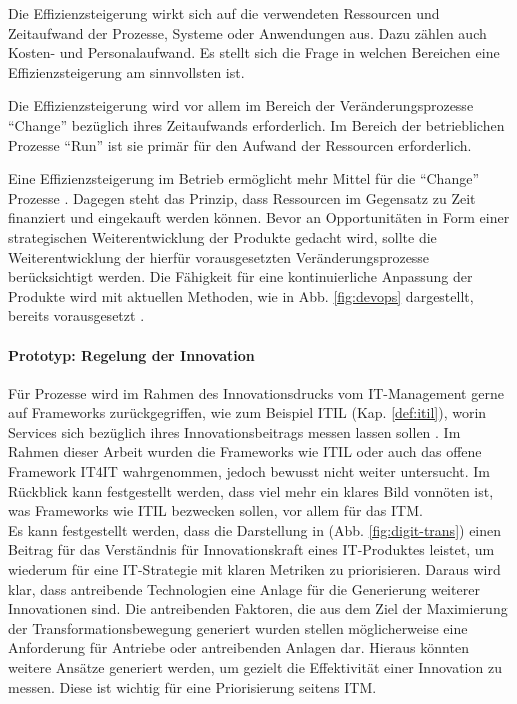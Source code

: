 \begin{enumerate}
    Die Effizienzsteigerung wirkt sich auf die verwendeten Ressourcen und Zeitaufwand der Prozesse, Systeme oder Anwendungen aus. Dazu zählen auch Kosten- und Personalaufwand. Es stellt sich die Frage in welchen Bereichen eine Effizienzsteigerung am sinnvollsten ist.
    
    Die Effizienzsteigerung wird vor allem im Bereich der Veränderungsprozesse \enquote{Change} bezüglich ihres Zeitaufwands erforderlich. Im Bereich der betrieblichen Prozesse \enquote{Run} ist sie primär für den Aufwand der Ressourcen erforderlich.
    
    Eine Effizienzsteigerung im Betrieb ermöglicht mehr Mittel für die \enquote{Change} Prozesse \cite{Rausch2006}. Dagegen steht das Prinzip, dass Ressourcen im Gegensatz zu Zeit finanziert und eingekauft werden können. Bevor an Opportunitäten in Form einer strategischen Weiterentwicklung der Produkte \cite{Rausch2006} gedacht wird, sollte die Weiterentwicklung der hierfür vorausgesetzten Veränderungsprozesse berücksichtigt werden. Die Fähigkeit für eine kontinuierliche Anpassung \cite{Bussmann2006, Ganswindt2006} der Produkte wird mit aktuellen Methoden, wie in Abb. \ref{fig:devops} dargestellt, bereits vorausgesetzt \cite{Alt2017}.

\end{enumerate}

\paragraph{Prototyp: Regelung der Innovation}
Für Prozesse wird im Rahmen des Innovationsdrucks vom IT-Management gerne auf Frameworks zurückgegriffen, wie zum Beispiel ITIL (Kap. \ref{def:itil}), worin Services sich bezüglich ihres Innovationsbeitrags messen lassen sollen \cite{Alt2017}. Im Rahmen dieser Arbeit wurden die Frameworks wie ITIL oder auch das offene Framework IT4IT wahrgenommen, jedoch bewusst nicht weiter untersucht. Im Rückblick kann festgestellt werden, dass viel mehr ein klares Bild vonnöten ist, was Frameworks wie ITIL bezwecken sollen, vor allem für das \ac{ITM}.
\medskip
\\
Es kann festgestellt werden, dass die Darstellung in (Abb. \ref{fig:digit-trans}) einen Beitrag für das Verständnis für Innovationskraft eines IT-Produktes leistet, um wiederum für eine IT-Strategie mit klaren Metriken zu priorisieren. Daraus wird klar, dass antreibende Technologien eine Anlage für die Generierung weiterer Innovationen sind. Die antreibenden Faktoren, die aus dem Ziel der Maximierung der Transformationsbewegung generiert wurden stellen möglicherweise eine Anforderung für Antriebe oder antreibenden Anlagen dar. Hieraus könnten weitere Ansätze generiert werden, um gezielt die Effektivität einer Innovation zu messen. Diese ist wichtig für eine Priorisierung seitens \ac{ITM}.

